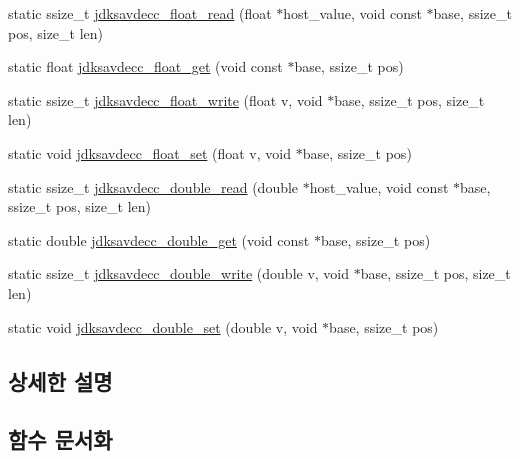 \begin{DoxyCompactItemize}
\item 
static ssize\+\_\+t \hyperlink{group__endian_gacf0a331ccb0ce2d1cd417dcc4dbd46ee}{jdksavdecc\+\_\+float\+\_\+read} (float $\ast$host\+\_\+value, void const $\ast$base, ssize\+\_\+t pos, size\+\_\+t len)
\item 
static float \hyperlink{group__endian_gadf6108d4d5f2936dd5018e4b80265c8c}{jdksavdecc\+\_\+float\+\_\+get} (void const $\ast$base, ssize\+\_\+t pos)
\item 
static ssize\+\_\+t \hyperlink{group__endian_ga5a2f14797e18454da8a06d2d6c59855f}{jdksavdecc\+\_\+float\+\_\+write} (float v, void $\ast$base, ssize\+\_\+t pos, size\+\_\+t len)
\item 
static void \hyperlink{group__endian_ga1f92dcb7b9e5f21f1df4b563ee9e04d5}{jdksavdecc\+\_\+float\+\_\+set} (float v, void $\ast$base, ssize\+\_\+t pos)
\item 
static ssize\+\_\+t \hyperlink{group__endian_ga4b4e5311acf1159669c2d94363883ad2}{jdksavdecc\+\_\+double\+\_\+read} (double $\ast$host\+\_\+value, void const $\ast$base, ssize\+\_\+t pos, size\+\_\+t len)
\item 
static double \hyperlink{group__endian_ga74132605402958c80f4cd58bffd67fee}{jdksavdecc\+\_\+double\+\_\+get} (void const $\ast$base, ssize\+\_\+t pos)
\item 
static ssize\+\_\+t \hyperlink{group__endian_ga8d16ab87b5e89447e725d0088bc0e594}{jdksavdecc\+\_\+double\+\_\+write} (double v, void $\ast$base, ssize\+\_\+t pos, size\+\_\+t len)
\item 
static void \hyperlink{group__endian_ga0efee3e089a95754c56b630a6d496b7b}{jdksavdecc\+\_\+double\+\_\+set} (double v, void $\ast$base, ssize\+\_\+t pos)
\end{DoxyCompactItemize}


\subsection{상세한 설명}


\subsection{함수 문서화}
